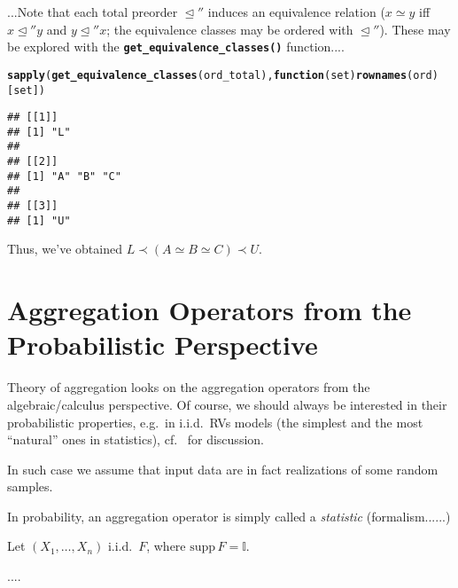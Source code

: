\documentclass[11pt]{article}\usepackage{graphicx, color}
\makeatletter
\newcommand{\hlfunctioncall}[1]{\textcolor[rgb]{0.501960784313725,0,0.329411764705882}{\textbf{#1}}}%
\newenvironment{kframe}{%
 \def\at@end@of@kframe{}%
 \ifinner\ifhmode%
  \def\at@end@of@kframe{\end{minipage}}%
  \begin{minipage}{\columnwidth}%
 \fi\fi%
 \def\FrameCommand##1{\hskip\@totalleftmargin \hskip-\fboxsep
 \colorbox{shadecolor}{##1}\hskip-\fboxsep
     \hskip-\linewidth \hskip-\@totalleftmargin \hskip\columnwidth}%
 \MakeFramed {\advance\hsize-\width
   \@totalleftmargin\z@ \linewidth\hsize
   \@setminipage}}%
 {\par\unskip\endMakeFramed%
 \at@end@of@kframe}
\newenvironment{knitrout}{}{} %
\renewcommand{\emph}[1]{\textsl{#1}}
\newcommand{\Rfunc}[1]{\texttt{\hlfunctioncall{#1}}}
\newcommand{\Ival}{\mathbb{I}}
\theoremstyle{remark}
\theoremstyle{definition}
\makeatother
\begin{document}
...Note that each total preorder $\trianglelefteq''$ induces an
equivalence relation ($x\simeq y$ iff $x\trianglelefteq''y$ and $y\trianglelefteq''x$;
the equivalence classes may be ordered with $\trianglelefteq''$).
These may be explored with the \Rfunc{get\_equivalence\_classes()}
function....

\begin{knitrout}\small
{}\color{fgcolor}\begin{kframe}
\begin{alltt}
\hlfunctioncall{sapply}(\hlfunctioncall{get_equivalence_classes}(ord_total), \hlfunctioncall{function}(set) \hlfunctioncall{rownames}(ord)[set])
\end{alltt}
\begin{verbatim}
## [[1]]
## [1] "L"
## 
## [[2]]
## [1] "A" "B" "C"
## 
## [[3]]
## [1] "U"
\end{verbatim}
\end{kframe}
\end{knitrout}


Thus, we've obtained $L \prec (A \simeq B \simeq C) \prec U$.








\section{Aggregation Operators from the Probabilistic Perspective}

Theory of aggregation looks on the aggregation operators
from the algebraic/calculus perspective. Of course, we should
always be interested in their probabilistic properties,
e.g.~in i.i.d.~RVs models (the simplest and the most ``natural''
ones in statistics), cf.~\cite{Gagolewski2011:PhD} for discussion.

In such case we assume that input data are in fact realizations
of some random samples.

In probability, an aggregation operator
is simply called a \emph{statistic} (formalism......)

Let $(X_1,\dots,X_n)$ i.i.d.~$F$, where $\mathrm{supp}\,F = \Ival$.

....
\end{document}

